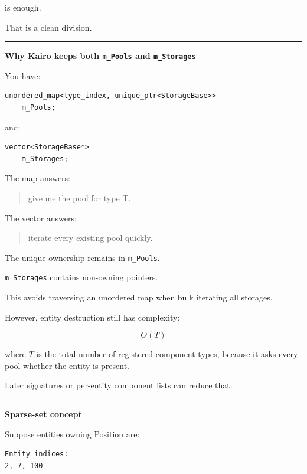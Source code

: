 is enough.

That is a clean division.

\begin{center}\rule{0.5\linewidth}{0.5pt}\end{center}

\textbf{Why Kairo keeps both \texttt{m\_Pools} and \texttt{m\_Storages}}

You have:

\begin{verbatim}
unordered_map<type_index, unique_ptr<StorageBase>>
    m_Pools;
\end{verbatim}

and:

\begin{verbatim}
vector<StorageBase*>
    m_Storages;
\end{verbatim}

The map answers:

\begin{quote}
give me the pool for type T.
\end{quote}

The vector answers:

\begin{quote}
iterate every existing pool quickly.
\end{quote}

The unique ownership remains in \texttt{m\_Pools}.

\texttt{m\_Storages} contains non-owning pointers.

This avoids traversing an unordered map when bulk iterating all storages.

However, entity destruction still has complexity:

\[
O(T)
\]

where \(T\) is the total number of registered component types, because it asks every pool whether the entity is present.

Later signatures or per-entity component lists can reduce that.

\begin{center}\rule{0.5\linewidth}{0.5pt}\end{center}

\textbf{Sparse-set concept}

Suppose entities owning Position are:

\begin{verbatim}
Entity indices:
2, 7, 100
\end{verbatim}

